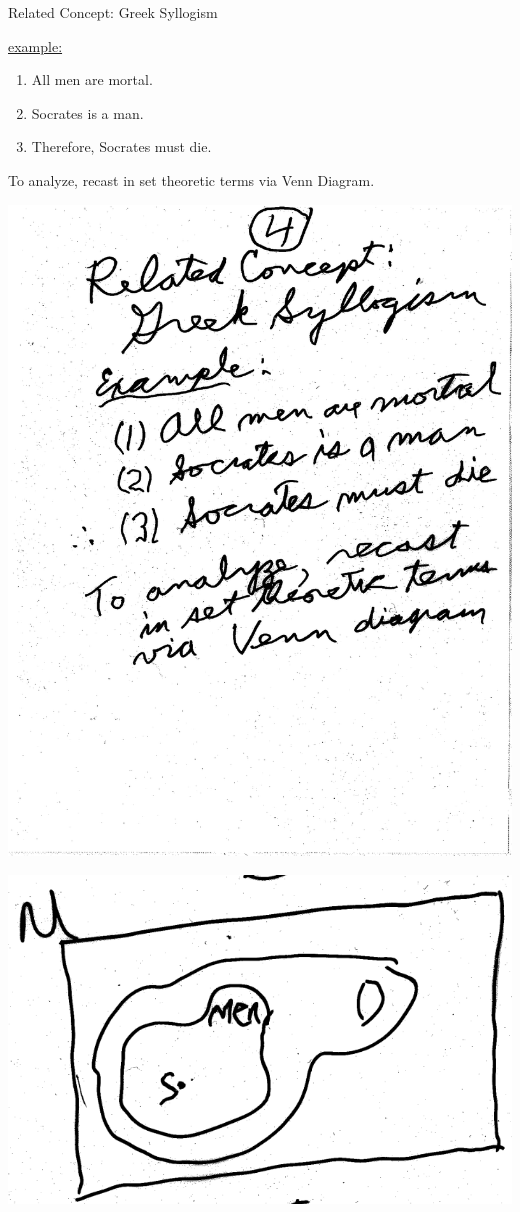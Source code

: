 \documentclass[10pt,a4paper]{article}
\begin{document}
Related Concept: Greek Syllogism

\underline{example:}
\begin{enumerate}
\item All men are mortal.
\item Socrates is a man.
\item Therefore, Socrates must die. 
\end{enumerate}

To analyze, recast in set theoretic terms via Venn Diagram.

\includegraphics[scale=.5]{Pages/ST_4}

\newpage

\includegraphics[scale=.2]{Pages/ST_5_im1}
\end{document}
